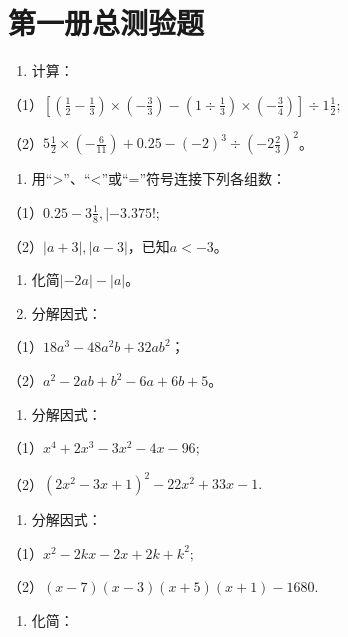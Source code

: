 \chapter{第一册总测验题}

\begin{enumerate}
\item
  计算：
\end{enumerate}

（1）\(\left[\left(\frac{1}{2} - \frac{1}{3}\right) \times \left(-\frac{3}{3}\right) - \left(1 \div \frac{1}{3}\right) \times \left(-\frac{3}{4}\right)\right] \div 1\frac{1}{2};\)

（2）\(5\frac{1}{2} \times \left(-\frac{6}{11}\right) + 0.25 - (-2)^{3} \div \left(-2\frac{2}{3}\right)^{2}\)。

\begin{enumerate}[start=2]
\item
  用``\textgreater''、``\textless''或``=''符号连接下列各组数：
\end{enumerate}

（1）\(0.25 - 3\frac{1}{8}, | - 3.375!;\)

（2）\(|a+3|, |a-3|\)，已知\(a<-3\)。

\begin{enumerate}[start=3]
\item
  化简\(|-2a| - |a|\)。
\item
  分解因式：
\end{enumerate}

（1）\(18a^{3} - 48a^{2}b + 32ab^{2}\)；

（2）\(a^2 - 2ab + b^2 - 6a + 6b + 5\)。

\begin{enumerate}[start=5]
\item
  分解因式：
\end{enumerate}

（1）\(x^{4} + 2x^{3} - 3x^{2} - 4x - 96;\)

（2）\((2x^{2} - 3x + 1)^{2} - 22x^{2} + 33x - 1.\)

\begin{enumerate}[start=6]
\item
  分解因式：
\end{enumerate}

（1）\(x^{2} - 2kx - 2x + 2k + k^{2};\)

（2）\((x - 7)(x - 3)(x + 5)(x + 1) - 1680.\)

\begin{enumerate}[start=7]
\item
  化简：
\end{enumerate}


